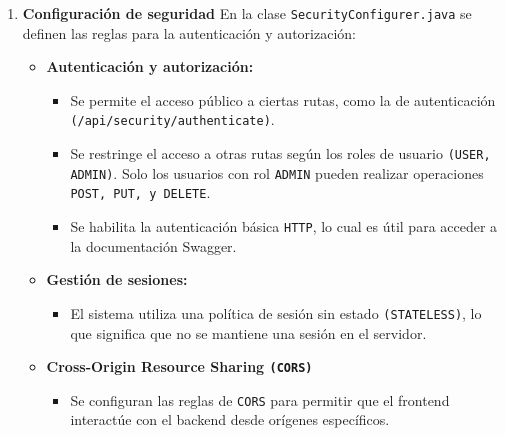 \documentclass{article} %
\begin{document}
    \begin{enumerate}
        \item \textbf{Configuración de seguridad}
        \noindent En la clase \texttt{SecurityConfigurer.java} se definen las reglas para la autenticación y autorización:
        \begin{itemize}
            \item \textbf{Autenticación y autorización:}
            \begin{itemize}
                \item Se permite el acceso público a ciertas rutas, como la de autenticación \\\texttt{(/api/security/authenticate)}.
                \item Se restringe el acceso a otras rutas según los roles de usuario \texttt{(USER, ADMIN)}. Solo los usuarios con rol \texttt{ADMIN} pueden realizar operaciones \texttt{POST, PUT, y DELETE}.
                \item Se habilita la autenticación básica \texttt{HTTP}, lo cual es útil para acceder a la documentación Swagger.
            \end{itemize}
            \item \textbf{Gestión de sesiones:}
            \begin{itemize}
                \item El sistema utiliza una política de sesión sin estado \texttt{(STATELESS)}, lo que significa que no se mantiene una sesión en el servidor.
            \end{itemize}
            \item \textbf{Cross-Origin Resource Sharing \texttt{(CORS)}}
            \begin{itemize}
                \item Se configuran las reglas de \texttt{CORS} para permitir que el frontend interactúe con el backend desde orígenes específicos.
            \end{itemize}
        \end{itemize}
        

\end{enumerate}
\end{document}
